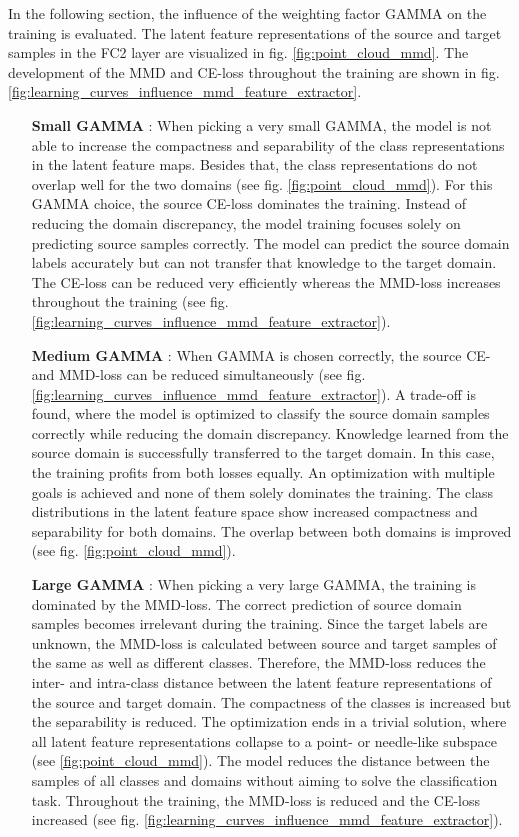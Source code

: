 In the following section, the influence of the weighting factor GAMMA on the training is evaluated. The latent feature representations of the source and target samples in the FC2 layer are visualized in fig. \ref{fig:point_cloud_mmd}. The development of the MMD and CE-loss throughout the training are shown in fig. \ref{fig:learning_curves_influence_mmd_feature_extractor}.
\begin{itemize}
    \item [\textbf{Small GAMMA}]:
    When picking a very small GAMMA, the model is not able to increase the compactness and separability of the class representations in the latent feature maps. Besides that, the class representations do not overlap well for the two domains (see fig. \ref{fig:point_cloud_mmd}). For this GAMMA choice, the source CE-loss dominates the training. Instead of reducing the domain discrepancy, the model training focuses solely on predicting source samples correctly. The model can predict the source domain labels accurately but can not transfer that knowledge to the target domain. The CE-loss can be reduced very efficiently whereas the MMD-loss increases throughout the training (see fig. \ref{fig:learning_curves_influence_mmd_feature_extractor}).
    \item [\textbf{Medium GAMMA}]:
    When GAMMA is chosen correctly, the source CE- and MMD-loss can be reduced simultaneously (see fig. \ref{fig:learning_curves_influence_mmd_feature_extractor}). A trade-off is found, where the model is optimized to classify the source domain samples correctly while reducing the domain discrepancy. Knowledge learned from the source domain is successfully transferred to the target domain. In this case, the training profits from both losses equally. An optimization with multiple goals is achieved and none of them solely dominates the training. The class distributions in the latent feature space show increased compactness and separability for both domains. The overlap between both domains is improved (see fig. \ref{fig:point_cloud_mmd}).
    \item [\textbf{Large GAMMA}]:
    When picking a very large GAMMA, the training is dominated by the MMD-loss. The correct prediction of source domain samples becomes irrelevant during the training. Since the target labels are unknown, the MMD-loss is calculated between source and target samples of the same as well as different classes. Therefore, the MMD-loss reduces the inter- and intra-class distance between the latent feature representations of the source and target domain. The compactness of the classes is increased but the separability is reduced. The optimization ends in a trivial solution, where all latent feature representations collapse to a point- or needle-like subspace (see \ref{fig:point_cloud_mmd}). The model reduces the distance between the samples of all classes and domains without aiming to solve the classification task. Throughout the training, the MMD-loss is reduced and the CE-loss increased (see fig. \ref{fig:learning_curves_influence_mmd_feature_extractor}).
\end{itemize}

